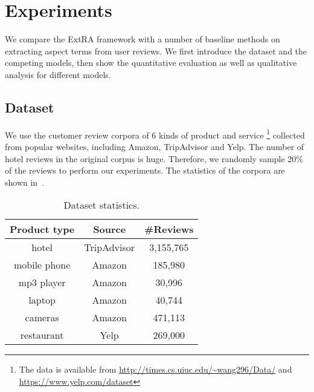 \section{Experiments}
\label{sec:experiments}
We compare the ExtRA framework with a number of 
baseline methods on extracting aspect terms from user reviews. 
We first introduce the dataset and the competing models, then
show the quantitative evaluation as well as qualitative analysis for
different models.

\subsection{Dataset}
\label{sec:dataset}
We use the customer review corpora of 6 kinds of product and service
\footnote{The data is available from
\url{http://times.cs.uiuc.edu/~wang296/Data/} and 
\url{https://www.yelp.com/dataset}} collected from popular websites, 
including Amazon, TripAdvisor and Yelp. 
The number of hotel reviews \cite{Wang2011LearningOD} in the original
corpus is huge. 
Therefore, we randomly sample 20\% of the reviews to perform our experiments.
The statistics of the corpora are shown in~.
\begin{table}[th]
\scriptsize
\centering
\vspace{-0.5cm}
\caption{Dataset statistics.} 
\label{table:dataset}
\vspace{-0.2cm}
\begin{tabular}{|c|c|c|}
\hline
\textbf{Product type} & \textbf{Source} & \textbf{\#Reviews} \\ \hline \hline
hotel        & TripAdvisor & 3,155,765   \\\hline
mobile phone & Amazon & 185,980  \\\hline
mp3 player   & Amazon & 30,996   \\\hline
laptop       & Amazon & 40,744   \\\hline
cameras & Amazon & 471,113  \\\hline
restaurant   & Yelp & 269,000   \\\hline
\end{tabular}
\vspace{-0.2cm}
\end{table}

